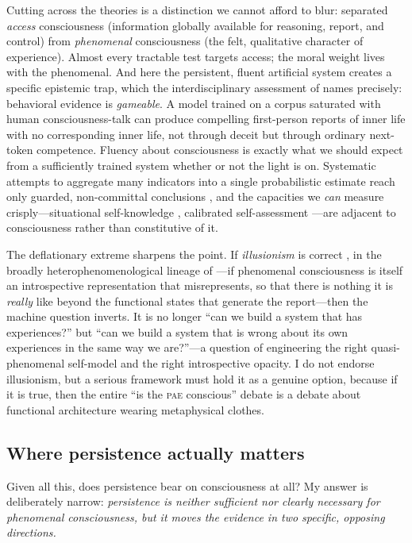 \documentclass[11pt,a4paper]{article}
\theoremstyle{definition}
\newcommand{\pae}{\textsc{pae}\xspace}
\begin{document}
Cutting across the theories is a distinction we cannot afford to blur: \citet{block1995} separated \emph{access} consciousness (information globally available for reasoning, report, and control) from \emph{phenomenal} consciousness (the felt, qualitative character of experience). Almost every tractable test targets access; the moral weight lives with the phenomenal. And here the persistent, fluent artificial system creates a specific epistemic trap, which the interdisciplinary assessment of \citet{butlin2023} names precisely: behavioral evidence is \emph{gameable}. A model trained on a corpus saturated with human consciousness-talk can produce compelling first-person reports of inner life with no corresponding inner life, not through deceit but through ordinary next-token competence. Fluency about consciousness is exactly what we should expect from a sufficiently trained system whether or not the light is on. Systematic attempts to aggregate many indicators into a single probabilistic estimate reach only guarded, non-committal conclusions \citep{shiller2026dcm}, and the capacities we \emph{can} measure crisply---situational self-knowledge \citep{laine2024sad}, calibrated self-assessment \citep{kadavath2022}---are adjacent to consciousness rather than constitutive of it.

The deflationary extreme sharpens the point. If \emph{illusionism} is correct \citep{frankish2016}, in the broadly heterophenomenological lineage of \citet{dennett1991}---if phenomenal consciousness is itself an introspective representation that misrepresents, so that there is nothing it is \emph{really} like beyond the functional states that generate the report---then the machine question inverts. It is no longer ``can we build a system that has experiences?'' but ``can we build a system that is wrong about its own experiences in the same way we are?''---a question of engineering the right quasi-phenomenal self-model and the right introspective opacity. I do not endorse illusionism, but a serious framework must hold it as a genuine option, because if it is true, then the entire ``is the \pae{} conscious'' debate is a debate about functional architecture wearing metaphysical clothes.

\subsection{Where persistence actually matters}

Given all this, does persistence bear on consciousness at all? My answer is deliberately narrow: \emph{persistence is neither sufficient nor clearly necessary for phenomenal consciousness, but it moves the evidence in two specific, opposing directions.}
\end{document}
